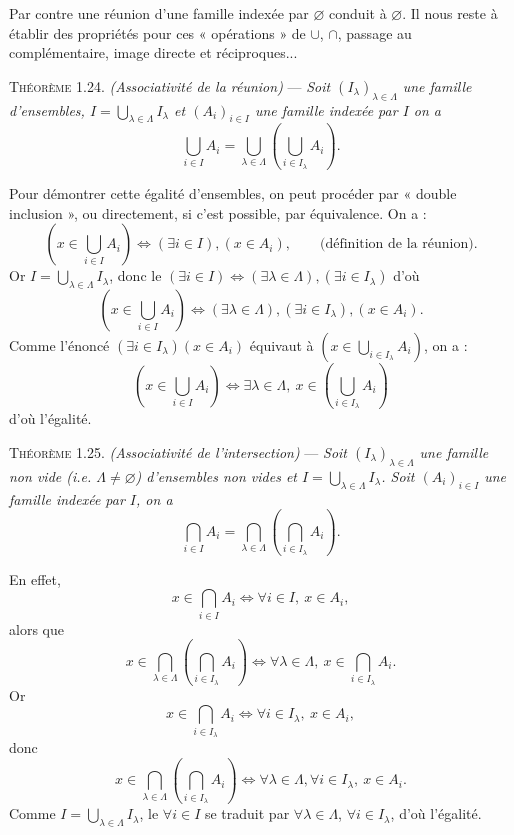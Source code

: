 Par contre une réunion d'une famille indexée par $\varnothing$ conduit à $\varnothing$. Il nous reste à établir des propriétés pour ces « opérations » de $\cup$, $\cap$, passage au complémentaire, image directe et réciproques...

\medskip\noindent\textsc{Théorème 1.24.} \emph{(Associativité de la réunion)} --- \emph{Soit $(I_\lambda)_{\lambda\in\Lambda}$ une famille d'ensembles, $I=\bigcup_{\lambda\in\Lambda}I_\lambda$ et $(A_i)_{i\in I}$ une famille indexée par $I$ on a}
\[
\bigcup_{i\in I}A_i=\bigcup_{\lambda\in\Lambda}\left(\bigcup_{i\in I_\lambda}A_i\right).
\]

Pour démontrer cette égalité d'ensembles, on peut procéder par « double inclusion », ou directement, si c'est possible, par équivalence. On a :
\[
\left(x\in\bigcup_{i\in I}A_i\right)\Leftrightarrow(\exists i\in I),(x\in A_i),\qquad\text{(définition de la réunion).}
\]
Or $I=\bigcup_{\lambda\in\Lambda}I_\lambda$, donc le $(\exists i\in I)\Leftrightarrow(\exists\lambda\in\Lambda),(\exists i\in I_\lambda)$ d'où
\[
\left(x\in\bigcup_{i\in I}A_i\right)\Leftrightarrow(\exists\lambda\in\Lambda),(\exists i\in I_\lambda),(x\in A_i).
\]
Comme l'énoncé $(\exists i\in I_\lambda)(x\in A_i)$ équivaut à $\left(x\in\bigcup_{i\in I_\lambda}A_i\right)$, on a :
\[
\left(x\in\bigcup_{i\in I}A_i\right)\Leftrightarrow\exists\lambda\in\Lambda,\ x\in\left(\bigcup_{i\in I_\lambda}A_i\right)
\]
d'où l'égalité. \bookend

\medskip\noindent\textsc{Théorème 1.25.} \emph{(Associativité de l'intersection)} --- \emph{Soit $(I_\lambda)_{\lambda\in\Lambda}$ une famille non vide (i.e. $\Lambda\ne\varnothing$) d'ensembles non vides et $I=\bigcup_{\lambda\in\Lambda}I_\lambda$. Soit $(A_i)_{i\in I}$ une famille indexée par $I$, on a}
\[
\bigcap_{i\in I}A_i=\bigcap_{\lambda\in\Lambda}\left(\bigcap_{i\in I_\lambda}A_i\right).
\]

En effet,
\[
x\in\bigcap_{i\in I}A_i\Leftrightarrow\forall i\in I,\ x\in A_i,
\]
alors que
\[
x\in\bigcap_{\lambda\in\Lambda}\left(\bigcap_{i\in I_\lambda}A_i\right)
\Leftrightarrow\forall\lambda\in\Lambda,\ x\in\bigcap_{i\in I_\lambda}A_i.
\]
Or
\[
x\in\bigcap_{i\in I_\lambda}A_i\Leftrightarrow\forall i\in I_\lambda,\ x\in A_i,
\]
donc
\[
x\in\bigcap_{\lambda\in\Lambda}\left(\bigcap_{i\in I_\lambda}A_i\right)
\Leftrightarrow\forall\lambda\in\Lambda,\forall i\in I_\lambda,\ x\in A_i.
\]
Comme $I=\bigcup_{\lambda\in\Lambda}I_\lambda$, le $\forall i\in I$ se traduit par $\forall\lambda\in\Lambda$, $\forall i\in I_\lambda$, d'où l'égalité. \bookend

